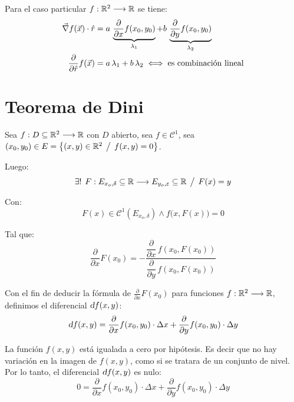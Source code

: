 \documentclass[a5paper,12pt,twoside]{book}
\begin{document}
Para el caso particular $f:\mathbb{R}^2 \longrightarrow \mathbb{R}$ se tiene:
\begin{align*}
    \Vec{\nabla} f(\Vec{x}) \cdot \hat{r} &= a \, \underbrace{\dfrac{\partial}{\partial x} f(x_0,y_0)}_{\lambda_1} + b \, \underbrace{\dfrac{\partial}{\partial y} f(x_0,y_0)}_{\lambda_2}
    \\
    \frac{\partial}{\partial \hat{r}} f(\Vec{x}) &= a\,\lambda_1 + b\,\lambda_2 \iff \textrm{es combinación lineal}
\end{align*}


\section{Teorema de Dini} %

Sea $f:D \subseteq \mathbb{R}^2 \longrightarrow \mathbb{R}$ con $D$ abierto, sea $f \in \mathcal{C}^1$, sea $(x_0,y_0) \in E = { \left\{ { (x,y) \in \mathbb{R}^2 \hspace{1ex} \big/ \hspace{1ex} f(x,y)=0 } \right\} }$.

Luego:
\begin{equation*}
    \exists ! \hspace{1ex} F:E_{x_o, \delta} \subseteq \mathbb{R} \longrightarrow E_{y_o, \varepsilon} \subseteq \mathbb{R} \hspace{1ex} \big/ \hspace{1ex} F(x)=y
\end{equation*}

Con:
\begin{equation*}
    F(x) \in \mathcal{C}^1(E_{x_o, \delta}) \land f \big( x,F(x) \big) = 0
\end{equation*}

Tal que:
\begin{equation*}
    \frac{\partial}{\partial x} F(x_0) = - \dfrac{\dfrac{\partial}{\partial x} \, f \left( x_0,F(x_0) \right)}{\dfrac{\partial}{\partial y} \, f \left( x_0,F(x_0) \right)}
\end{equation*}


Con el fin de deducir la fórmula de $\tfrac{\partial}{\partial x} F(x_0)$ para funciones $f:\mathbb{R}^2 \longrightarrow \mathbb{R}$, definimos el diferencial $\textsl{d} f(x,y)$:
\begin{equation*}
    \textsl{d} f(x,y) = \dfrac{\partial}{\partial x} f(x_0,y_0) \cdot \Delta x + \dfrac{\partial}{\partial y} f(x_0,y_0) \cdot \Delta y
\end{equation*}

La función $f(x,y)$ está igualada a cero por hipótesis.
Es decir que no hay variación en la imagen de $f(x,y)$, como si se tratara de un conjunto de nivel.
Por lo tanto, el diferencial $\textsl{d} f(x,y)$ es nulo:
\begin{equation*}
    0 = \dfrac{\partial}{\partial x} f(x_0,y_0) \cdot \Delta x + \dfrac{\partial}{\partial y} f(x_0,y_0) \cdot \Delta y
\end{equation*}
\end{document}
